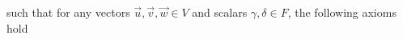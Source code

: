\documentclass[preview]{standalone}
\begin{document}
\begin{center}
such that for any vectors $\overrightarrow{u}, \overrightarrow{v}, \overrightarrow{w} \in V$ and scalars $\gamma , \delta \in F$, the following axioms hold
\end{center}
\end{document}
